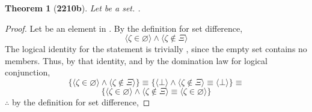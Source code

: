 \documentclass[preview]{standalone}
\newtheorem*{theorem*}{Theorem}\renewcommand\qedsymbol{$\blacksquare$}
\begin{document}
\begin{theorem*}[\textbf{2210b}] \color{black}
    Let \bm{$\Xi$} be a set. 
    \bm{$\varnothing - \Xi = \varnothing$}.
\end{theorem*}
\begin{proof} \color{black}
    Let \bm{$\zeta$} be an element in \bm{$\varnothing - \Xi$}. 
    By the definition for set difference,
    \begin{equation*}
        \Big \langle \zeta \in \varnothing \Big \rangle
            \land 
        \Big \langle \zeta \notin \Xi \Big \rangle
    \end{equation*}
    The logical identity for the statement \bm{$\zeta \in \varnothing$} is trivially \bm{$\bot$}, 
    since the empty set contains no members. 
    Thus, by that identity, and by the domination law for logical conjunction,
    \begin{equation*}
        \Bigg\{
            \Big \langle \zeta \in \varnothing \Big \rangle
                \land 
            \Big \langle \zeta \notin \Xi \Big \rangle
        \Bigg\}
            \equiv
        \Bigg\{
            \Big \langle \bot \Big \rangle
                \land 
            \Big \langle \zeta \notin \Xi \Big \rangle 
                \equiv 
            \Big \langle \bot \Big \rangle
        \Bigg\}
            \equiv
    \end{equation*}
    \begin{equation*}
        \Bigg\{
            \Big \langle \zeta \in \varnothing \Big \rangle
                \land 
            \Big \langle \zeta \notin \Xi \Big \rangle
                \equiv
            \Big \langle \zeta \in \varnothing \Big \rangle
        \Bigg\}
    \end{equation*}
    $\therefore$ by the definition for set difference,  
    \bm{$\varnothing - \Xi = \varnothing$}
\color{lightgray} \end{proof}
\end{document}
